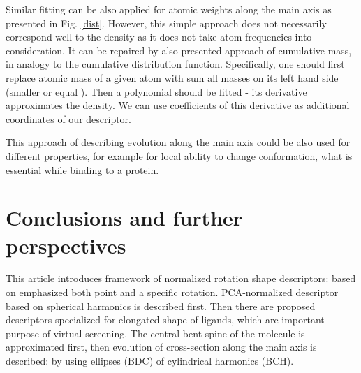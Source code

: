 \documentclass[10pt,journal]{IEEEtranTCOM}
\theoremstyle{plain}
\begin{document}
Similar fitting can be also applied for atomic weights along the main axis  as presented in Fig. \ref{dist}. However, this simple approach does not necessarily correspond well to the density as it does not take atom frequencies into consideration. It can be repaired by also presented approach of cumulative mass, in analogy to the cumulative distribution function. Specifically, one should first replace atomic mass of a given atom with sum all masses on its left hand side (smaller or equal ). Then a polynomial should be fitted - its derivative approximates the density. We can use coefficients of this derivative as additional coordinates of our descriptor.

This approach of describing evolution along the main axis  could be also used for different properties, for example for local ability to change conformation, what is essential while binding to a protein.

\section{Conclusions and further perspectives}
This article introduces framework of normalized rotation shape descriptors: based on emphasized both point and a specific rotation. PCA-normalized descriptor based on spherical harmonics is described first. Then there are proposed descriptors specialized for elongated shape of ligands, which are important purpose of virtual screening. The central bent spine of the molecule is approximated first, then evolution of cross-section along the main axis is described: by using ellipses (BDC) of cylindrical harmonics (BCH).
\end{document}
